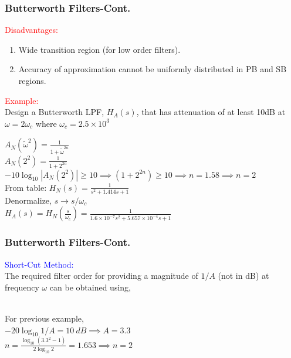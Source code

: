 \documentclass[mathserif, 10pt]{beamer} %
\begin{document}
\frame
{
\small
\frametitle{Butterworth Filters-Cont.}

\textcolor{red}{Disadvantages:}\\
\begin{enumerate}
	\item Wide transition region (for low order filters).
	\item Accuracy of approximation cannot be uniformly distributed in PB and SB regions.
\end{enumerate}

\textcolor{red}{Example:} \\
Design a Butterworth LPF, $H_A(s)$, that has attenuation of at least 10dB at $\omega=2\omega_c$ where
$\omega_c = 2.5 \times 10^3$\\ \vspace{.2in}

$A_N(\tilde\omega^2) = \frac{1}{1+\tilde\omega^{2n}}$\\ \vspace{.1in}
$A_N(2^2) = \frac{1}{1+2^{2n}}$\\ \vspace{.1in}
$-10 \log_{10}{|A_N(2^2)|} \ge10\implies (1+2^{2n})\ge 10 \implies n= 1.58 \implies n=2$\\ \vspace{.1in}
From table:  $H_N(s) = \frac{1}{s^2+1.414s+1}$\\ \vspace{.1in}
Denormalize, $s\to s/\omega_c$\\ \vspace{.1in}
$H_A(s) = H_N(\frac{s}{\omega_c}) = \frac{1}{1.6\times 10^{-7}s^2+5.657\times 10^{-4}s+1}$




}

\frame
{
\small
\frametitle{Butterworth Filters-Cont.}

\textcolor{blue}{Short-Cut Method:} \\ \vspace{.1in}
The required filter order for providing a magnitude of $1/A$ (not in dB) at frequency $\omega$ can be obtained using, \vspace{.2in}


 \\ \vspace{.1in}
For previous example, \\ \vspace{.1in}
$-20 \log_{10} 1/A =10 ~dB  \implies A=3.3$ \\ \vspace{.1in}
$n= \frac{\log_{10} (3.3^2-1)}{2\log_{10} 2}=1.653 \implies n=2$ \\ \vspace{.1in}





}
\end{document}
